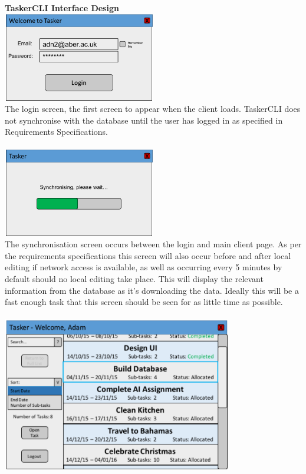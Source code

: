 \documentclass{project}
\begin{document}
\textbf{TaskerCLI Interface Design} \\
\newline
\includegraphics[width=0.5\textwidth, center]{images/5.2/TaskerCLILogin} \\
The login screen, the first screen to appear when the client loads. TaskerCLI does not synchronise with the database until the user has logged in as specified in Requirements Specifications.\cite{se.qa.rs fr8 user id} \\~\\
\newline
\includegraphics[width=0.5\textwidth, center]{images/5.2/TaskerCLILoading} \\
The synchronisation screen occurs between the login and main client page. As per the requirements specifications \cite{se.qa.rs fr11} this screen will also occur before and after local editing if network access is available, as well as occurring every 5 minutes by default should no local editing take place. This will display the relevant information from the database as it's downloading the data. Ideally this will be a fast enough task that this screen should be seen for as little time as possible. \\~\\
\newline
\includegraphics[width=0.75\textwidth, center]{images/5.2/TaskerCLIMainScreen} \\
\end{document}
